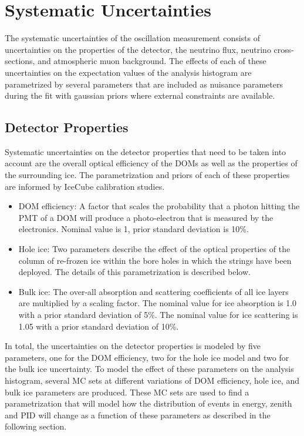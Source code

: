 \section{Systematic Uncertainties}
The systematic uncertainties of the oscillation measurement consists of uncertainties on the properties of the detector, the neutrino flux, neutrino cross-sections, and atmospheric muon background. The effects of each of these uncertainties on the expectation values of the analysis histogram are parametrized by several parameters that are included as nuisance parameters during the fit with gaussian priors where external constraints are available. 

\subsection{Detector Properties}
\label{sec:detector-unc}
Systematic uncertainties on the detector properties that need to be taken into account are the overall optical efficiency of the DOMs as well as the properties of the surrounding ice. The parametrization and priors of each of these properties are informed by IceCube calibration studies. 
\begin{itemize}
    \item DOM efficiency: A factor that scales the probability that a photon hitting the PMT of a DOM will produce a photo-electron that is measured by the electronics. Nominal value is 1, prior standard deviation is 10\%.
    \item Hole ice: Two parameters describe the effect of the optical properties of the column of re-frozen ice within the bore holes in which the strings have been deployed. The details of this parametrization is described below.
    \item Bulk ice: The over-all absorption and scattering coefficients of all ice layers are multiplied by a scaling factor. The nominal value for ice absorption is 1.0 with a prior standard deviation of 5\%. The nominal value for ice scattering is 1.05 with a prior standard deviation of 10\%.
\end{itemize}

In total, the uncertainties on the detector properties is modeled by five  parameters, one for the DOM efficiency, two for the hole ice model and two for the bulk ice uncertainty. To model the effect of these parameters on the analysis histogram, several MC sets at different variations of DOM efficiency, hole ice, and bulk ice parameters are produced. These MC sets are used to find a parametrization that will model how the distribution of events in energy, zenith and PID will change as a function of these parameters as described in the following section.

